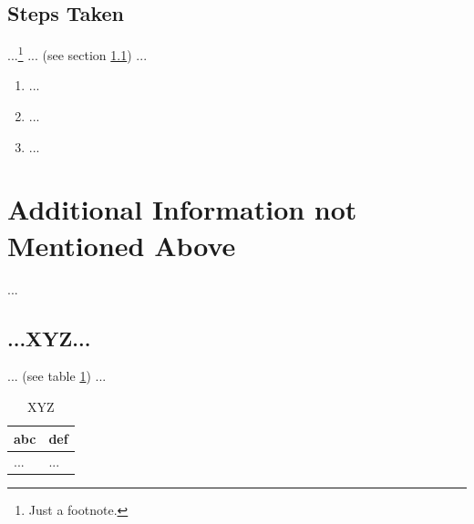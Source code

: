 \subsection{Steps Taken}\label{oswp-sec:sec2-steps}
%
...\footnote{Just a footnote.} ... (see section \ref{oswp-sec:last-xyz}) ...

\begin{enumerate}
    \item ...
    \item ...
    \item ...
\end{enumerate}
%
%
%
\section{Additional Information not Mentioned Above}\label{oswp-sec:last}
%
...
%
%
%
\subsection{...XYZ...}\label{oswp-sec:last-xyz}
%
... (see table \ref{oswp-tbl:last-xyz}) ...

\begin{table}[H]
    \begin{tabularx}{\textwidth}{l|l}
        \textbf{abc} & \textbf{def} \\
        \hline
        ... & ...\\
    \end{tabularx}
    \caption{XYZ\label{oswp-tbl:last-xyz}}
\end{table}
%
%
%

